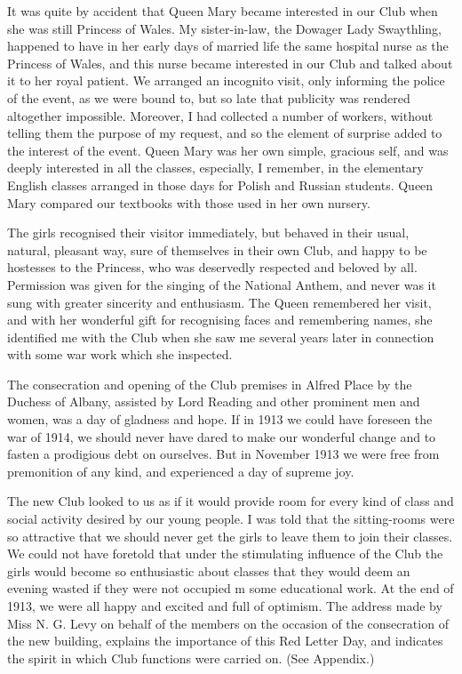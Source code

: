 It was quite by accident that Queen Mary became
interested in our Club when she was still Princess of
Wales. My sister-in-law, the Dowager Lady Swaythling,
happened to have in her early days of married life the
same hospital nurse as the Princess of Wales, and this
nurse became interested in our Club and talked about it
to her royal patient. We arranged an incognito visit, only
informing the police of the event, as we were bound to,
but so late that publicity was rendered altogether impossible.
Moreover, I had collected a number of workers,
without telling them the purpose of my request, and so
the element of surprise added to the interest of the event.
Queen Mary was her own simple, gracious self, and was
deeply interested in all the classes, especially, I remember,
in the elementary English classes arranged in those
days for Polish and Russian students. Queen Mary
compared our textbooks with those used in her own
nursery.

The girls recognised their visitor immediately, but
behaved in their usual, natural, pleasant way, sure of
themselves in their own Club, and happy to be hostesses
to the Princess, who was deservedly respected and beloved
by all. Permission was given for the singing of the
National Anthem, and never was it sung with greater
sincerity and enthusiasm. The Queen remembered her
visit, and with her wonderful gift for recognising faces
and remembering names, she identified me with the Club
when she saw me several years later in connection with
some war work which she inspected.

The consecration and opening of the Club premises
in Alfred Place by the Duchess of Albany, assisted by
Lord Reading and other prominent men and women, was
a day of gladness and hope. If in 1913 we could have
foreseen the war of 1914, we should never have dared to
make our wonderful change and to fasten a prodigious
debt on ourselves. But in November 1913 we were
free from premonition of any kind, and experienced a day
of supreme joy.

The new Club looked to us as if it would provide room
for every kind of class and social activity desired by our
young people. I was told that the sitting-rooms were so
attractive that we should never get the girls to leave
them to join their classes. We could not have foretold
that under the stimulating influence of the Club the girls
would become so enthusiastic about classes that they
would deem an evening wasted if they were not occupied
m some educational work. At the end of 1913, we were
all happy and excited and full of optimism. The address
made by Miss N. G. Levy on behalf of the members on
the occasion of the consecration of the new building,
explains the importance of this Red Letter Day, and indicates
the spirit in which Club functions were carried on.
(See Appendix.)

